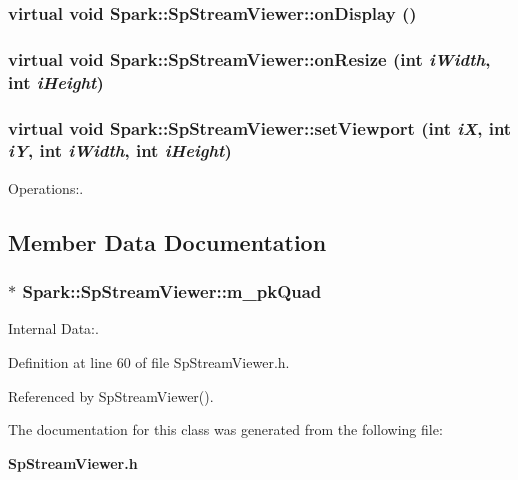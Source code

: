 \subsubsection{\setlength{\rightskip}{0pt plus 5cm}virtual void Spark::Sp\-Stream\-Viewer::on\-Display ()\hspace{0.3cm}{\tt  [pure virtual]}}\label{classSpark_1_1SpStreamViewer_a4}


\subsubsection{\setlength{\rightskip}{0pt plus 5cm}virtual void Spark::Sp\-Stream\-Viewer::on\-Resize (int {\em i\-Width}, int {\em i\-Height})\hspace{0.3cm}{\tt  [pure virtual]}}\label{classSpark_1_1SpStreamViewer_a3}


\subsubsection{\setlength{\rightskip}{0pt plus 5cm}virtual void Spark::Sp\-Stream\-Viewer::set\-Viewport (int {\em i\-X}, int {\em i\-Y}, int {\em i\-Width}, int {\em i\-Height})\hspace{0.3cm}{\tt  [pure virtual]}}\label{classSpark_1_1SpStreamViewer_a2}


Operations:. 



\subsection{Member Data Documentation}
\subsubsection{$\ast$ {\bf Spark::Sp\-Stream\-Viewer::m\_\-pk\-Quad}\hspace{0.3cm}{\tt  [protected]}}\label{classSpark_1_1SpStreamViewer_p0}


Internal Data:. 

Definition at line 60 of file Sp\-Stream\-Viewer.h.

Referenced by Sp\-Stream\-Viewer().

The documentation for this class was generated from the following file:\begin{CompactItemize}
\item 
{\bf Sp\-Stream\-Viewer.h}\end{CompactItemize}
